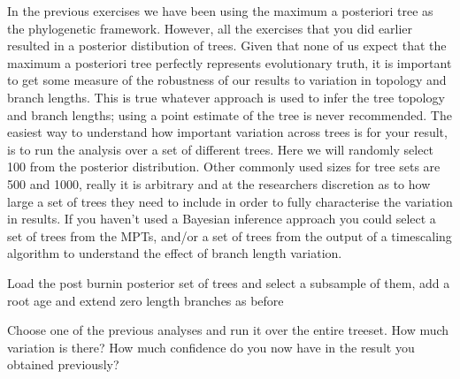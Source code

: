 \documentclass[]{article}
\newenvironment{Shaded}{\begin{snugshade}}{\end{snugshade}}
\newcommand{\KeywordTok}[1]{\textcolor[rgb]{0.13,0.29,0.53}{\textbf{#1}}}
\newcommand{\DataTypeTok}[1]{\textcolor[rgb]{0.13,0.29,0.53}{#1}}
\newcommand{\DecValTok}[1]{\textcolor[rgb]{0.00,0.00,0.81}{#1}}
\newcommand{\FloatTok}[1]{\textcolor[rgb]{0.00,0.00,0.81}{#1}}
\newcommand{\StringTok}[1]{\textcolor[rgb]{0.31,0.60,0.02}{#1}}
\newcommand{\OtherTok}[1]{\textcolor[rgb]{0.56,0.35,0.01}{#1}}
\newcommand{\ControlFlowTok}[1]{\textcolor[rgb]{0.13,0.29,0.53}{\textbf{#1}}}
\newcommand{\OperatorTok}[1]{\textcolor[rgb]{0.81,0.36,0.00}{\textbf{#1}}}
\newcommand{\NormalTok}[1]{#1}
\begin{document}
In the previous exercises we have been using the maximum a posteriori
tree as the phylogenetic framework. However, all the exercises that you
did earlier resulted in a posterior distibution of trees. Given that
none of us expect that the maximum a posteriori tree perfectly
represents evolutionary truth, it is important to get some measure of
the robustness of our results to variation in topology and branch
lengths. This is true whatever approach is used to infer the tree
topology and branch lengths; using a point estimate of the tree is never
recommended. The easiest way to understand how important variation
across trees is for your result, is to run the analysis over a set of
different trees. Here we will randomly select 100 from the posterior
distribution. Other commonly used sizes for tree sets are 500 and 1000,
really it is arbitrary and at the researchers discretion as to how large
a set of trees they need to include in order to fully characterise the
variation in results. If you haven't used a Bayesian inference approach
you could select a set of trees from the MPTs, and/or a set of trees
from the output of a timescaling algorithm to understand the effect of
branch length variation.

Load the post burnin posterior set of trees and select a subsample of
them, add a root age and extend zero length branches as before

\begin{Shaded}
\end{Shaded}

Choose one of the previous analyses and run it over the entire treeset.
How much variation is there? How much confidence do you now have in the
result you obtained previously?
\end{document}
